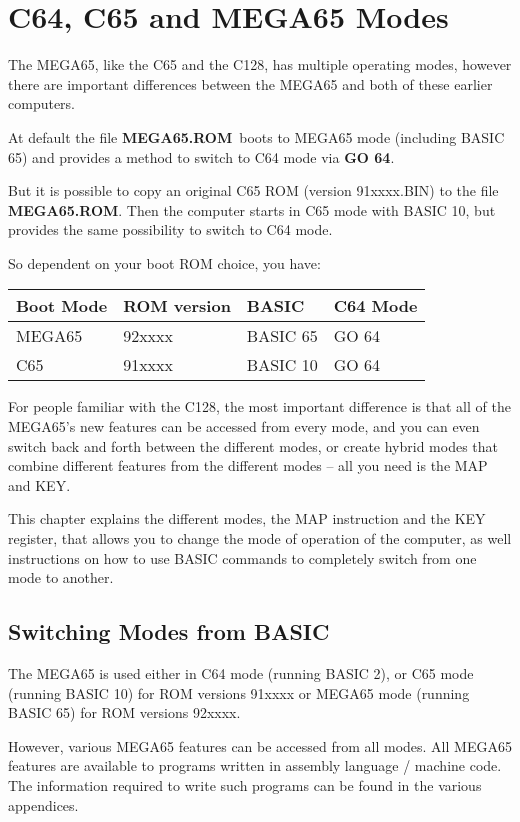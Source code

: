 \chapter {C64, C65 and MEGA65 Modes}
\label{cha:modes}

The MEGA65, like the C65 and the C128, has multiple operating modes,
however there are important differences between the MEGA65 and both
of these earlier computers.

At default the file {\bf MEGA65.ROM} boots to MEGA65 mode
(including BASIC 65) and
provides a method to switch to C64 mode via {\bf GO 64}.

But it is possible to copy an original C65 ROM (version 91xxxx.BIN)
to the file {\bf MEGA65.ROM}. Then the computer starts in C65 mode
with BASIC 10, but provides the same possibility to switch to C64 mode.

So dependent on your boot ROM choice, you have:

\begin{tabular}{|l|l|l|l|}
\hline
Boot Mode & ROM version & BASIC & C64 Mode \\
\hline
MEGA65    & 92xxxx      & BASIC 65 & GO 64 \\
C65       & 91xxxx      & BASIC 10 & GO 64 \\
\hline
\end{tabular}

For people familiar with the C128,
the most important difference is that all of the MEGA65's new features
can be accessed from every mode, and you can even switch back and forth
between the different modes, or create hybrid modes that combine different
features from the different modes -- all you need is the MAP and KEY.

This chapter explains the different modes, the MAP instruction and
the KEY register, that allows you to change the mode of operation of the computer,
as well instructions on how to use BASIC commands to completely switch
from one mode to another.

\section{Switching Modes from BASIC}

The MEGA65 is used either
in C64 mode (running BASIC 2),
or C65 mode (running BASIC 10) for ROM versions 91xxxx
or MEGA65 mode (running BASIC 65) for ROM versions 92xxxx.

However, various MEGA65
features can be accessed from all modes.  All MEGA65 features are available
to programs written in assembly language / machine code.  The information required
to write such programs can be found in the various appendices.

